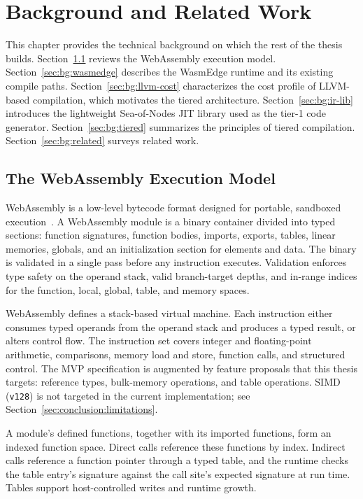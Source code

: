 
\chapter{Background and Related Work}
\label{ch:background}

This chapter provides the technical background on which the rest of the thesis builds. Section~\ref{sec:bg:wasm} reviews the WebAssembly execution model. Section~\ref{sec:bg:wasmedge} describes the WasmEdge runtime and its existing compile paths. Section~\ref{sec:bg:llvm-cost} characterizes the cost profile of LLVM-based compilation, which motivates the tiered architecture. Section~\ref{sec:bg:ir-lib} introduces the lightweight Sea-of-Nodes JIT library used as the tier-1 code generator. Section~\ref{sec:bg:tiered} summarizes the principles of tiered compilation. Section~\ref{sec:bg:related} surveys related work.

\section{The WebAssembly Execution Model}
\label{sec:bg:wasm}

WebAssembly is a low-level bytecode format designed for portable, sandboxed execution~\cite{haas2017wasm,wasm-spec}. A WebAssembly module is a binary container divided into typed sections: function signatures, function bodies, imports, exports, tables, linear memories, globals, and an initialization section for elements and data. The binary is validated in a single pass before any instruction executes. Validation enforces type safety on the operand stack, valid branch-target depths, and in-range indices for the function, local, global, table, and memory spaces.

WebAssembly defines a stack-based virtual machine. Each instruction either consumes typed operands from the operand stack and produces a typed result, or alters control flow. The instruction set covers integer and floating-point arithmetic, comparisons, memory load and store, function calls, and structured control. The MVP specification is augmented by feature proposals that this thesis targets: reference types, bulk-memory operations, and table operations. SIMD (\texttt{v128}) is not targeted in the current implementation; see Section~\ref{sec:conclusion:limitations}.

A module's defined functions, together with its imported functions, form an indexed function space. Direct calls reference these functions by index. Indirect calls reference a function pointer through a typed table, and the runtime checks the table entry's signature against the call site's expected signature at run time. Tables support host-controlled writes and runtime growth.

